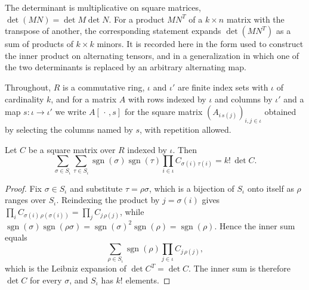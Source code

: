 The determinant is multiplicative on square matrices, $\det(MN) = \det M \det N$. For a product $MN^{T}$ of a $k \times n$ matrix with the transpose of another, the corresponding statement expands $\det(MN^{T})$ as a sum of products of $k \times k$ minors. It is recorded here in the form used to construct the inner product on alternating tensors, and in a generalization in which one of the two determinants is replaced by an arbitrary alternating map.

Throughout, $R$ is a commutative ring, $\iota$ and $\iota'$ are finite index sets with $\iota$ of cardinality $k$, and for a matrix $A$ with rows indexed by $\iota$ and columns by $\iota'$ and a map $s \colon \iota \to \iota'$ we write $A[\,\cdot\,, s]$ for the square matrix $(A_{i\,s(j)})_{i,j \in \iota}$ obtained by selecting the columns named by $s$, with repetition allowed.

\begin{lemma}
\label{lem:sum-sign-prod-det}
\leanok
Let $C$ be a square matrix over $R$ indexed by $\iota$. Then
\[
\sum_{\sigma \in S_\iota} \sum_{\tau \in S_\iota} \operatorname{sgn}(\sigma)\operatorname{sgn}(\tau) \prod_{i \in \iota} C_{\sigma(i)\,\tau(i)} = k!\,\det C .
\]
\end{lemma}
\begin{proof}
\leanok
Fix $\sigma \in S_\iota$ and substitute $\tau = \rho\sigma$, which is a bijection of $S_\iota$ onto itself as $\rho$ ranges over $S_\iota$. Reindexing the product by $j = \sigma(i)$ gives $\prod_{i} C_{\sigma(i)\,\rho(\sigma(i))} = \prod_{j} C_{j\,\rho(j)}$, while $\operatorname{sgn}(\sigma)\operatorname{sgn}(\rho\sigma) = \operatorname{sgn}(\sigma)^2\operatorname{sgn}(\rho) = \operatorname{sgn}(\rho)$. Hence the inner sum equals
\[
\sum_{\rho \in S_\iota} \operatorname{sgn}(\rho) \prod_{j \in \iota} C_{j\,\rho(j)},
\]
which is the Leibniz expansion of $\det C^{T} = \det C$. The inner sum is therefore $\det C$ for every $\sigma$, and $S_\iota$ has $k!$ elements.
\end{proof}

